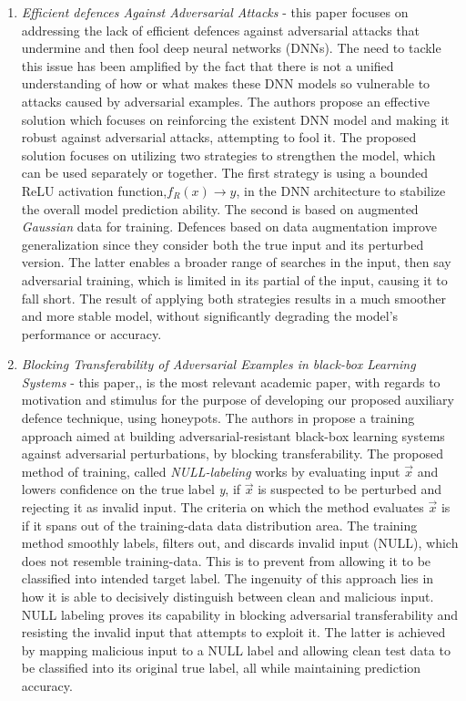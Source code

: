 \documentclass[grad,lot,lof,11pt,oneside,onehalfspace]{RUthesis}
\begin{document}
\begin{enumerate}
	\item \textit{Efficient defences Against Adversarial Attacks} - this paper \cite{zantedeschi_efficient_2017} focuses on addressing the lack of efficient defences against adversarial attacks that undermine and then fool deep neural networks (DNNs). The need to tackle this issue has been amplified by the fact that there is not a unified understanding of how or what makes these DNN models so vulnerable to attacks caused by adversarial examples. The authors propose an effective solution which focuses on reinforcing the existent DNN model and making it robust against adversarial attacks, attempting to fool it. The proposed solution focuses on utilizing two strategies to strengthen the model, which can be used separately or together. The first strategy is using a bounded ReLU activation function,\textit{$f_{R}(x) \rightarrow y$}, in the DNN architecture to stabilize the overall model prediction ability. The second is based on augmented \textit{Gaussian} data for training. Defences based on data augmentation improve generalization since they consider both the true input and its perturbed version. The latter enables a broader range of searches in the input, then say adversarial training, which is limited in its partial of the input, causing it to fall short.  The result of applying both strategies results in a much smoother and more stable model, without  significantly degrading the model's performance or accuracy. 
	\item \textit{Blocking Transferability of Adversarial Examples in black-box Learning Systems} - this paper,\cite{hosseini_blocking_2017},  is the most relevant academic paper, with regards to motivation and stimulus for the purpose of developing our proposed auxiliary defence technique, using honeypots. The authors in \cite{hosseini_blocking_2017} propose a training approach aimed at building adversarial-resistant black-box learning systems against adversarial perturbations, by blocking transferability. The proposed method of training, called \textit{NULL-labeling} works by evaluating input $\vec{x}$ and lowers confidence on the true label \textit{y}, if $\vec{x}$ is suspected to be perturbed and rejecting it as invalid input. The criteria on which the method evaluates $\vec{x}$ is if it spans out of the training-data data distribution area. The training method smoothly labels, filters out, and discards invalid input (NULL), which does not resemble training-data. This is to prevent from allowing it to be classified into intended target label. The ingenuity of this approach lies in how it is able to decisively distinguish between clean and malicious input. NULL labeling proves its capability in blocking adversarial transferability and resisting the invalid input that attempts to exploit it. The latter is achieved by mapping malicious input to a NULL label and allowing clean test data to be classified into its original true label, all while maintaining prediction accuracy.

\end{enumerate}
\end{document}
